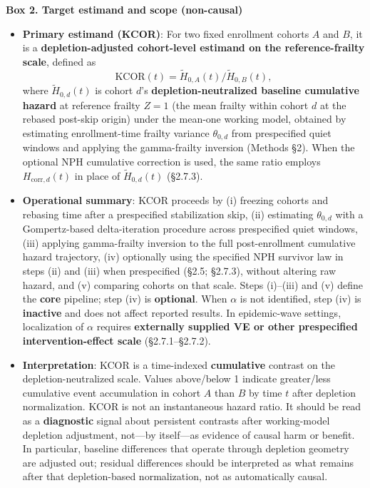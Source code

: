 \documentclass[
]{article}
\providecommand{\tightlist}{%
  \setlength{\itemsep}{0pt}\setlength{\parskip}{0pt}}
\renewenvironment{quote}{\begin{mdframed}[style=kcorquote]}{\end{mdframed}}
\begin{document}
\begin{quote}
\textbf{Box 2. Target estimand and scope (non-causal)}

\begin{itemize}
\tightlist
\item
  \textbf{Primary estimand (KCOR)}: For two fixed enrollment cohorts \(A\) and \(B\), it is a \textbf{depletion-adjusted cohort-level estimand on the reference-frailty scale}, defined as \[\mathrm{KCOR}(t)=\tilde H_{0,A}(t)/\tilde H_{0,B}(t),\] where \(\tilde H_{0,d}(t)\) is cohort \(d\)'s \textbf{depletion-neutralized baseline cumulative hazard} at reference frailty \(Z=1\) (the mean frailty within cohort \(d\) at the rebased post-skip origin) under the mean-one working model, obtained by estimating enrollment-time frailty variance \(\theta_{0,d}\) from prespecified quiet windows and applying the gamma-frailty inversion (Methods §2). When the optional NPH cumulative correction is used, the same ratio employs \(H_{\mathrm{corr},d}(t)\) in place of \(\tilde H_{0,d}(t)\) (§2.7.3).
\item
  \textbf{Operational summary}: KCOR proceeds by (i) freezing cohorts and rebasing time after a prespecified stabilization skip, (ii) estimating \(\theta_{0,d}\) with a Gompertz-based delta-iteration procedure across prespecified quiet windows, (iii) applying gamma-frailty inversion to the full post-enrollment cumulative hazard trajectory, (iv) optionally using the specified NPH survivor law in steps (ii) and (iii) when prespecified (§2.5; §2.7.3), without altering raw hazard, and (v) comparing cohorts on that scale. Steps (i)--(iii) and (v) define the \textbf{core} pipeline; step (iv) is \textbf{optional}. When \(\alpha\) is not identified, step (iv) is \textbf{inactive} and does not affect reported results. In epidemic-wave settings, localization of \(\alpha\) requires \textbf{externally supplied VE or other prespecified intervention-effect scale} (§2.7.1--§2.7.2).
\item
  \textbf{Interpretation}: KCOR is a time-indexed \textbf{cumulative} contrast on the depletion-neutralized scale. Values above/below 1 indicate greater/less cumulative event accumulation in cohort \(A\) than \(B\) by time \(t\) after depletion normalization. KCOR is not an instantaneous hazard ratio. It should be read as a \textbf{diagnostic} signal about persistent contrasts after working-model depletion adjustment, not---by itself---as evidence of causal harm or benefit. In particular, baseline differences that operate through depletion geometry are adjusted out; residual differences should be interpreted as what remains after that depletion-based normalization, not as automatically causal.

\end{itemize}
\end{quote}
\end{document}
